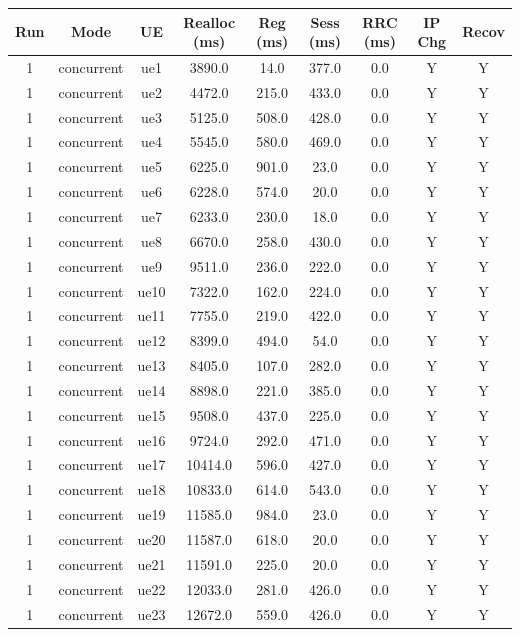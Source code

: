 \begin{table}[ht]
\centering
\begin{tabular}{|c|c|c|c|c|c|c|c|c|}
\hline
Run & Mode & UE & Realloc (ms) & Reg (ms) & Sess (ms) & RRC (ms) & IP Chg & Recov \\
\hline
1 & concurrent & ue1 & 3890.0 & 14.0 & 377.0 & 0.0 & Y & Y \\
1 & concurrent & ue2 & 4472.0 & 215.0 & 433.0 & 0.0 & Y & Y \\
1 & concurrent & ue3 & 5125.0 & 508.0 & 428.0 & 0.0 & Y & Y \\
1 & concurrent & ue4 & 5545.0 & 580.0 & 469.0 & 0.0 & Y & Y \\
1 & concurrent & ue5 & 6225.0 & 901.0 & 23.0 & 0.0 & Y & Y \\
1 & concurrent & ue6 & 6228.0 & 574.0 & 20.0 & 0.0 & Y & Y \\
1 & concurrent & ue7 & 6233.0 & 230.0 & 18.0 & 0.0 & Y & Y \\
1 & concurrent & ue8 & 6670.0 & 258.0 & 430.0 & 0.0 & Y & Y \\
1 & concurrent & ue9 & 9511.0 & 236.0 & 222.0 & 0.0 & Y & Y \\
1 & concurrent & ue10 & 7322.0 & 162.0 & 224.0 & 0.0 & Y & Y \\
1 & concurrent & ue11 & 7755.0 & 219.0 & 422.0 & 0.0 & Y & Y \\
1 & concurrent & ue12 & 8399.0 & 494.0 & 54.0 & 0.0 & Y & Y \\
1 & concurrent & ue13 & 8405.0 & 107.0 & 282.0 & 0.0 & Y & Y \\
1 & concurrent & ue14 & 8898.0 & 221.0 & 385.0 & 0.0 & Y & Y \\
1 & concurrent & ue15 & 9508.0 & 437.0 & 225.0 & 0.0 & Y & Y \\
1 & concurrent & ue16 & 9724.0 & 292.0 & 471.0 & 0.0 & Y & Y \\
1 & concurrent & ue17 & 10414.0 & 596.0 & 427.0 & 0.0 & Y & Y \\
1 & concurrent & ue18 & 10833.0 & 614.0 & 543.0 & 0.0 & Y & Y \\
1 & concurrent & ue19 & 11585.0 & 984.0 & 23.0 & 0.0 & Y & Y \\
1 & concurrent & ue20 & 11587.0 & 618.0 & 20.0 & 0.0 & Y & Y \\
1 & concurrent & ue21 & 11591.0 & 225.0 & 20.0 & 0.0 & Y & Y \\
1 & concurrent & ue22 & 12033.0 & 281.0 & 426.0 & 0.0 & Y & Y \\
1 & concurrent & ue23 & 12672.0 & 559.0 & 426.0 & 0.0 & Y & Y \\

\end{tabular}
\end{table}

